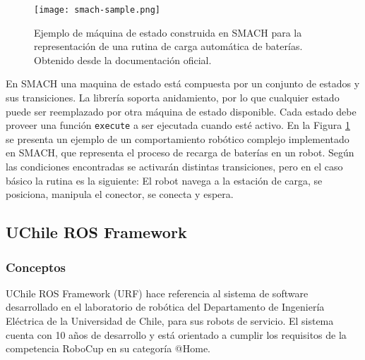 \begin{figure}[!h]
	\centering
	\texttt{[image: smach-sample.png]}
	\caption{\small Ejemplo de máquina de estado construida en SMACH para la representación de una rutina de carga automática de baterías. Obtenido desde la documentación oficial.}
	\label{img:SMACH-sample}
\end{figure}



En SMACH una maquina de estado está compuesta por un conjunto de estados y sus transiciones. La librería soporta anidamiento, por lo que cualquier estado puede ser reemplazado por otra máquina de estado disponible. Cada estado debe proveer una función \texttt{execute} a ser ejecutada cuando esté activo. En la Figura \ref{img:SMACH-sample} se presenta un ejemplo de un comportamiento robótico complejo implementado en SMACH, que representa el proceso de recarga de baterías en un robot. Según las condiciones encontradas se activarán distintas transiciones, pero en el caso básico la rutina es la siguiente: El robot navega a la estación de carga, se posiciona, manipula el conector, se conecta y espera.

\subsection{UChile ROS Framework}\label{sec:URF}

\subsubsection{Conceptos}

UChile ROS Framework (URF) hace referencia al sistema de software desarrollado en el laboratorio de robótica del Departamento de Ingeniería Eléctrica de la Universidad de Chile, para sus robots de servicio. El sistema cuenta con 10 años de desarrollo y está orientado a cumplir los requisitos de la competencia RoboCup en su categoría @Home.

